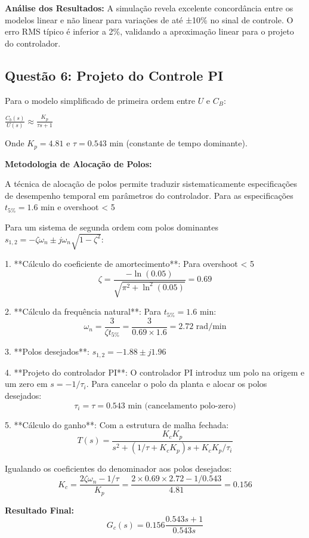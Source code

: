 \documentclass[a4paper,12pt]{article}
\begin{document}
\textbf{Análise dos Resultados:}
A simulação revela excelente concordância entre os modelos linear e não linear para variações de até ±10\% no sinal de controle. O erro RMS típico é inferior a 2\%, validando a aproximação linear para o projeto do controlador.

\subsection{Questão 6: Projeto do Controle PI}

Para o modelo simplificado de primeira ordem entre $U$ e $C_B$:

$\frac{C_b(s)}{U(s)} \approx \frac{K_p}{\tau s + 1}$

Onde $K_p = 4.81$ e $\tau = 0.543$ min (constante de tempo dominante).

\textbf{Metodologia de Alocação de Polos:}

A técnica de alocação de polos permite traduzir sistematicamente especificações de desempenho temporal em parâmetros do controlador. Para as especificações $t_{5\%} = 1.6$ min e overshoot < 5%

Para um sistema de segunda ordem com polos dominantes $s_{1,2} = -\zeta\omega_n \pm j\omega_n\sqrt{1-\zeta^2}$:

1. **Cálculo do coeficiente de amortecimento**: Para overshoot < 5%
   $$\zeta = \frac{-\ln(0.05)}{\sqrt{\pi^2 + \ln^2(0.05)}} = 0.69$$

2. **Cálculo da frequência natural**: Para $t_{5\%} = 1.6$ min:
   $$\omega_n = \frac{3}{\zeta t_{5\%}} = \frac{3}{0.69 \times 1.6} = 2.72 \text{ rad/min}$$

3. **Polos desejados**: $s_{1,2} = -1.88 \pm j1.96$

4. **Projeto do controlador PI**: O controlador PI introduz um polo na origem e um zero em $s = -1/\tau_i$. Para cancelar o polo da planta e alocar os polos desejados:
   $$\tau_i = \tau = 0.543 \text{ min (cancelamento polo-zero)}$$

5. **Cálculo do ganho**: Com a estrutura de malha fechada:
   $$T(s) = \frac{K_c K_p}{s^2 + (1/\tau + K_c K_p)s + K_c K_p/\tau_i}$$
   
   Igualando os coeficientes do denominador aos polos desejados:
   $$K_c = \frac{2\zeta\omega_n - 1/\tau}{K_p} = \frac{2 \times 0.69 \times 2.72 - 1/0.543}{4.81} = 0.156$$

\textbf{Resultado Final:}
$$G_c(s) = 0.156 \frac{0.543s + 1}{0.543s}$$
\end{document}
